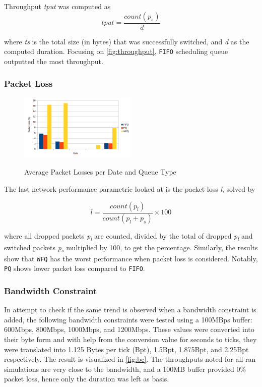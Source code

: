 \documentclass[journal]{IEEE/IEEEtran}
\begin{document}
Throughput \textit{tput} was computed as 
\[
	tput = \frac{count(p_s)}{d}
\]

where \textit{ts} is the total size (in bytes) that was successfully switched, and \textit{d} as the computed duration. Focusing on \ref{fig:throughput}, \texttt{FIFO} scheduling queue outputted the most throughput.

\subsubsection{Packet Loss}
\begin{figure}
\includegraphics[width=0.5\textwidth]{packetloss}
\label{fig:packetloss}\caption{Average Packet Losses per Date and Queue Type}
\end{figure}

The last network performance parametric looked at is the packet loss \textit{l}, solved by

\[
	l = \frac{count(p_l)}{count(p_l + p_s)} \times 100
\]

where all dropped packets \textit{p\textsubscript{l}} are counted, divided by the total of dropped \textit{p\textsubscript{l}} and switched packets \textit{p\textsubscript{s}} multiplied by 100, to get the percentage. Similarly, the results show that \texttt{WFQ} has the worst performance when packet loss is considered. Notably, \texttt{PQ} shows lower packet loss compared to \texttt{FIFO}.

\subsubsection{Bandwidth Constraint}
In attempt to check if the same trend is observed when a bandwidth constraint is added, the following bandwidth constraints were tested using a 100MBps buffer: 600Mbps, 800Mbps, 1000Mbps, and 1200Mbps. These values were converted into their byte form and with help from the conversion value for seconds to ticks, they were translated into 1.125 Bytes per tick (Bpt), 1.5Bpt, 1.875Bpt, and 2.25Bpt respectively. The result is visualized in \ref{fig:bc}. The throughputs noted for all ran simulations are very close to the bandwidth, and a 100MB buffer provided 0\% packet loss, hence only the duration was left as  basis.
\end{document}
